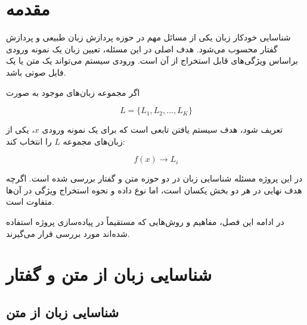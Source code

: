 




\section{مقدمه}

شناسایی خودکار زبان یکی از مسائل مهم در حوزه پردازش زبان طبیعی و پردازش گفتار محسوب می‌شود. هدف اصلی در این مسئله، تعیین زبان یک نمونه ورودی براساس ویژگی‌های قابل استخراج از آن است. ورودی سیستم می‌تواند یک متن یا یک فایل صوتی باشد.

اگر مجموعه زبان‌های موجود به صورت

\begin{equation}
L=\{L_1,L_2,\ldots,L_K\}
\end{equation}

تعریف شود، هدف سیستم یافتن تابعی است که برای یک نمونه ورودی $x$، یکی از زبان‌های مجموعه $L$ را انتخاب کند:

\begin{equation}
f(x)\longrightarrow L_i
\end{equation}

در این پروژه مسئله شناسایی زبان در دو حوزه متن و گفتار بررسی شده است. اگرچه هدف نهایی در هر دو بخش یکسان است، اما نوع داده و نحوه استخراج ویژگی در آن‌ها متفاوت است.

در ادامه این فصل، مفاهیم و روش‌هایی که مستقیماً در پیاده‌سازی پروژه استفاده شده‌اند مورد بررسی قرار می‌گیرند.


\section{شناسایی زبان از متن و گفتار}

\subsection{شناسایی زبان از متن}

